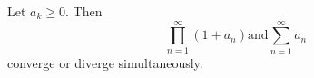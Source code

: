 \documentclass[12pt]{article}
\begin{document}
Let $a_k \geq 0$. Then \\
\begin{displaymath}
\prod_{n=1}^{\infty}(1+a_n) \text{and} \sum_{n=1}^{\infty} a_n
\end{displaymath}
converge or diverge simultaneously.
\end{document}
